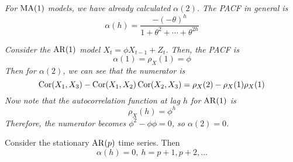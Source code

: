 \begin{example}
    \emph{
        For $\operatorname{MA}(1)$ models, we have already calculated $\alpha(2)$. The PACF in general is 
        \[\alpha(h) = \frac{-(-\theta)^h}{1 + \theta^2 + \cdots + \theta^{2h}}\]
    }
\end{example}

\begin{example}
    \emph{
        Consider the $\operatorname{AR}(1)$ model $X_t = \phi X_{t-1} + Z_t$. Then, the PACF is
        \[\alpha(1) = \rho_X(1) = \phi\]
        Then for $\alpha(2)$, we can see that the numerator is 
        \[\operatorname{Cor}(X_1,X_3) - \operatorname{Cor}(X_1,X_2)\operatorname{Cor}(X_2,X_3) = \rho_X(2) - \rho_X(1)\rho_X(1)\]
        Now note that the autocorrelation function at lag $h$ for $\operatorname{AR}(1)$ is 
        \[\rho_X(h) = \phi^h\]
        Therefore, the numerator becomes $\phi^2 - \phi\phi = 0$, so $\alpha(2) = 0$.
    }
\end{example}


\begin{theorem}
    Consider the stationary $\operatorname{AR}(p)$ time series. Then 
    \[\alpha(h) = 0, \ h = p+1, p + 2, \ldots\]
\end{theorem}